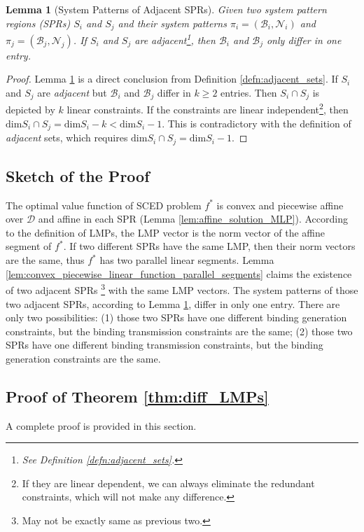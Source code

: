 \documentclass[letterpaper, 11pt]{article}
\theoremstyle{plain}
\newtheorem{lem}{Lemma}
\theoremstyle{definition}
\begin{document}
\begin{lem}[System Patterns of Adjacent SPRs]
\label{lem:adjacent_SPRs}
Given two system pattern regions (SPRs) $S_i$ and $S_j$ and their system patterns $\pi_i = (\mathcal{B}_i, \mathcal{N}_i ) $ and $\pi_j = (\mathcal{B}_j, \mathcal{N}_j )$. If $S_i$ and $S_j$ are \emph{adjacent}\footnote{See Definition \ref{defn:adjacent_sets}.}, then $\mathcal{B}_i$ and $\mathcal{B}_j$ only differ in one entry.
\end{lem}
\begin{proof}
Lemma \ref{lem:adjacent_SPRs} is a direct conclusion from Definition \ref{defn:adjacent_sets}.
If $S_i$ and $S_j$ are \emph{adjacent} but $\mathcal{B}_i$ and $\mathcal{B}_j$ differ in $k\ge 2$ entries. Then $S_i \cap S_j$ is depicted by $k$ linear constraints. If the constraints are linear independent\footnote{If they are linear dependent, we can always eliminate the redundant constraints, which will not make any difference.}, then $\text{dim}  S_i \cap S_j = \text{dim}  S_i - k < \text{dim}  S_i - 1$. This is contradictory with the definition of \emph{adjacent} sets, which requires $\text{dim}  S_i \cap S_j = \text{dim}  S_i -1$.
\end{proof}



\subsection{Sketch of the Proof} \label{sub:sketch_of_the_proof}
The optimal value function of SCED problem $f^*$ is convex and piecewise affine over $\mathcal{D}$ and affine in each SPR (Lemma \ref{lem:affine_solution_MLP}). According to the definition of LMPs, the LMP vector is the norm vector of the affine segment of $f^*$. 
If two different SPRs have the same LMP, then their norm vectors are the same, thus $f^*$ has two parallel linear segments. Lemma \ref{lem:convex_piecewise_linear_function_parallel_segments} claims the existence of two adjacent SPRs \footnote{May not be exactly same as previous two.} with the same LMP vectors. The system patterns of those two adjacent SPRs, according to Lemma \ref{lem:adjacent_SPRs}, differ in only one entry. 
There are only two possibilities: (1) those two SPRs have one different binding generation constraints, but the binding transmission constraints are the same; (2) those two SPRs have one different binding transmission constraints, but the binding generation constraints are the same.


\subsection{Proof of Theorem \ref{thm:diff_LMPs}} \label{sub:proof_of_theorem_ref_thm_diff_lmps}
A complete proof is provided in this section.
\end{document}
